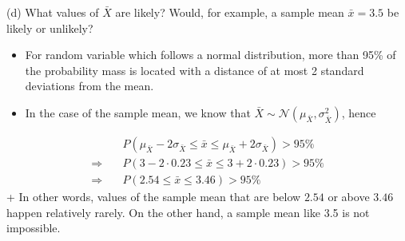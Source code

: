 \documentclass[
  11pt,
  ignorenonframetext,
]{beamer}
\begin{document}
\begin{frame}{(d) What values of \(\bar{X}\) are likely? Would, for
example, a sample mean \(\bar{x} = 3.5\) be likely or unlikely?}
\protect\hypertarget{d-what-values-of-barx-are-likely-would-for-example-a-sample-mean-barx-3.5-be-likely-or-unlikely}{}
\begin{itemize}
\item
  For random variable which follows a normal distribution, more than
  95\% of the probability mass is located with a distance of at most 2
  standard deviations from the mean.
\item
  In the case of the sample mean, we know that
  \(\bar{X} \sim \mathcal{N}\left(\mu_{\bar X},\sigma^2_{\bar X}\right)\),
  hence
\end{itemize}

\[
\begin{aligned}
&P(\mu_{\bar{X}}-2\sigma_{\bar{X}} \leq \bar{x} \leq \mu_{\bar{X}}+2\sigma_{\bar{X}}) > 95\% \\
\Rightarrow \quad &P(3-2\cdot0.23 \leq \bar{x} \leq 3+2\cdot0.23) > 95\% \\
\Rightarrow \quad &P(2.54 \leq \bar{x} \leq 3.46) > 95\%
\end{aligned}
\] + In other words, values of the sample mean that are below \(2.54\)
or above \(3.46\) happen relatively rarely. On the other hand, a sample
mean like 3.5 is not impossible.
\end{frame}
\end{document}
